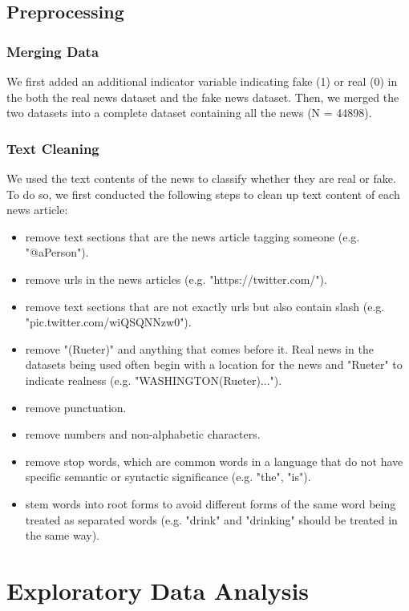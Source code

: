 \documentclass{article}
\begin{document}
\begin{multicols}{2}
\subsection{Preprocessing}

\subsubsection{Merging Data}
We first added an additional indicator variable indicating fake (1) or real (0) in the both the real news dataset and the fake news dataset. Then, we merged the two datasets into a complete dataset containing all the news (N = 44898). 

\subsubsection{Text Cleaning}
We used the text contents of the news to classify whether they are real or fake. To do so, we first conducted the following steps to clean up text content of each news article:
\begin{itemize}
  \item remove text sections that are the news article tagging someone (e.g. "@aPerson").
  \item remove urls in the news articles (e.g. "https://twitter.com/").
  \item remove text sections that are not exactly urls but also contain slash (e.g. "pic.twitter.com/wiQSQNNzw0").
  \item remove "(Rueter)" and anything that comes before it. Real news in the datasets being used often begin with a location for the news and "Rueter" to indicate realness (e.g. "WASHINGTON(Rueter)...").
  \item remove punctuation.
  \item remove numbers and non-alphabetic characters.
  \item remove stop words, which are common words in a language that do not have specific semantic or syntactic significance (e.g. "the", "is").
  \item stem words into root forms to avoid different forms of the same word being treated as separated words (e.g. "drink" and "drinking" should be treated in the same way).
 
\end{itemize}

\section{Exploratory Data Analysis}



\end{multicols}
\end{document}

